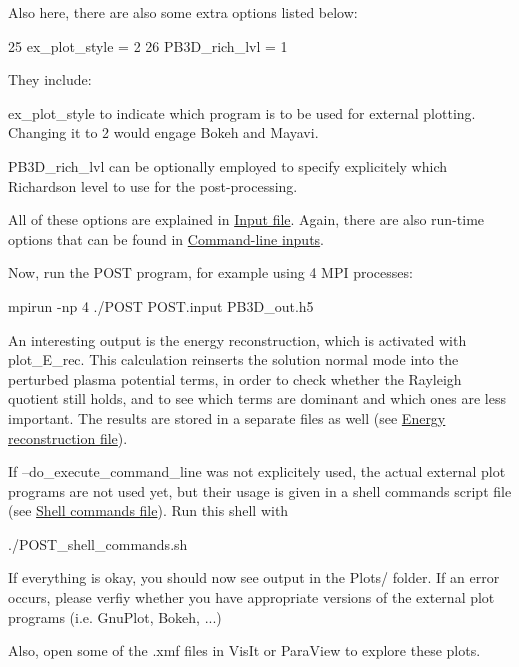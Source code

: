 Also here, there are also some extra options listed below\+: 
\begin{DoxyCodeInclude}
25     ex\_plot\_style           = 2
26     PB3D\_rich\_lvl           = 1
\end{DoxyCodeInclude}
They include\+:
\begin{DoxyItemize}
\item {\ttfamily ex\+\_\+plot\+\_\+style} to indicate which program is to be used for external plotting. Changing it to 2 would engage Bokeh and Mayavi.
\item {\ttfamily P\+B3\+D\+\_\+rich\+\_\+lvl} can be optionally employed to specify explicitely which Richardson level to use for the post-\/processing.
\end{DoxyItemize}

All of these options are explained in \hyperlink{page_inputs_inputs_POST_file}{Input file}. Again, there are also run-\/time options that can be found in \hyperlink{page_inputs_inputs_POST_cmd}{Command-\/line inputs}.

Now, run the P\+O\+ST program, for example using 4 M\+PI processes\+: 
\begin{DoxyCode}
mpirun -np 4 ./POST POST.input PB3D\_out.h5 
\end{DoxyCode}


An interesting output is the energy reconstruction, which is activated with {\ttfamily plot\+\_\+\+E\+\_\+rec}. This calculation reinserts the solution normal mode into the perturbed plasma potential terms, in order to check whether the Rayleigh quotient still holds, and to see which terms are dominant and which ones are less important. The results are stored in a separate files as well (see \hyperlink{page_outputs_output_file_E_rec}{Energy reconstruction file}).

If {\ttfamily --do\+\_\+execute\+\_\+command\+\_\+line} was not explicitely used, the actual external plot programs are not used yet, but their usage is given in a shell commands script file (see \hyperlink{page_outputs_output_file_shell}{Shell commands file}). Run this shell with 
\begin{DoxyCode}
./POST\_shell\_commands.sh 
\end{DoxyCode}


If everything is okay, you should now see output in the {\ttfamily Plots/} folder. If an error occurs, please verfiy whether you have appropriate versions of the external plot programs (i.\+e. Gnu\+Plot, Bokeh, ...)

Also, open some of the {\ttfamily .xmf} files in Vis\+It or Para\+View to explore these plots.

